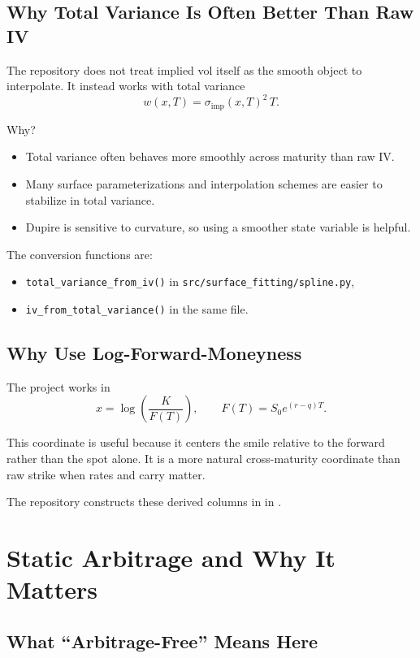 \documentclass[11pt]{article}
\begin{document}
\subsection{Why Total Variance Is Often Better Than Raw IV}

The repository does not treat implied vol itself as the smooth object to interpolate. It instead works with total variance
\[
w(x,T)=\sigma_{\text{imp}}(x,T)^2\,T.
\]

Why?

\begin{itemize}
  \item Total variance often behaves more smoothly across maturity than raw IV.
  \item Many surface parameterizations and interpolation schemes are easier to stabilize in total variance.
  \item Dupire is sensitive to curvature, so using a smoother state variable is helpful.
\end{itemize}

The conversion functions are:

\begin{itemize}
  \item \texttt{total\_variance\_from\_iv()} in \texttt{src/surface\_fitting/spline.py},
  \item \texttt{iv\_from\_total\_variance()} in the same file.
\end{itemize}

\subsection{Why Use Log-Forward-Moneyness}

The project works in
\[
x=\log\left(\frac{K}{F(T)}\right),
\qquad
F(T)=S_0 e^{(r-q)T}.
\]

This coordinate is useful because it centers the smile relative to the forward rather than the spot alone. It is a more natural cross-maturity coordinate than raw strike when rates and carry matter.

The repository constructs these derived columns in
 in .

\section{Static Arbitrage and Why It Matters}

\subsection{What ``Arbitrage-Free'' Means Here}
\end{document}
